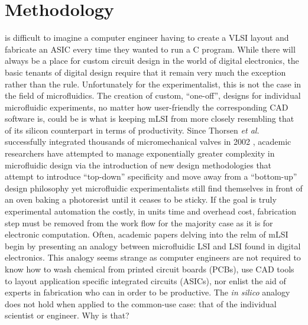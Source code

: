 \documentclass[11pt,journal,compsoc, onecolumn]{IEEEtran}
\begin{document}
\section{Methodology}
 is
difficult to imagine a computer engineer having to create a VLSI layout and
fabricate an ASIC every time they wanted to run a C program. While there will
always be a place for custom circuit design in the world of digital
electronics, the basic tenants of digital design require that it remain
very much the exception rather than the rule. Unfortunately for the
experimentalist, this is not the case in the field of microfluidics. 
The creation of custom, ``one-off'', designs
for individual microfluidic experiments, no matter how user-friendly the
corresponding CAD software is, could be is what is keeping mLSI from
more closely resembling that of its silicon counterpart in terms of
productivity. Since Thorsen \emph{et al.} successfully integrated thousands of
micromechanical valves in 2002 \cite{thorsen2002}, academic researchers have
attempted to manage exponentially greater complexity in microfluidic design via
the introduction of new design methodologies that attempt to introduce
``top-down'' specificity and move away from a ``bottom-up'' design philosophy
 \cite{minhass2013}\cite{melin2007}\cite{minhass2012} yet microfluidic
 experimentalists still find themselves in front of an oven baking a photoresist
until it ceases to be sticky. If the goal is truly experimental automation the
costly, in units time and overhead cost, fabrication step must be removed from the
work flow for the majority case as it is for electronic computation. 
Often, academic papers delving into the relm of mLSI begin by presenting an analogy
between microfluidic LSI and LSI found in digital electronics. This analogy seems
strange as computer engineers are not required to know how to wash chemical
from printed circuit boards (PCBs), use CAD tools to layout application
specific integrated circuits (ASICs), nor enlist the aid of experts in
fabrication who can in order to be productive.  The \emph{in
silico} analogy does not hold when applied to the common-use case: that of the
individual scientist or
engineer. Why is that? 
\end{document}
